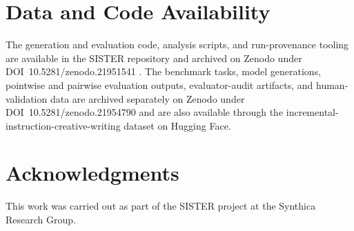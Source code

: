 \section*{Data and Code Availability}

The generation and evaluation code, analysis scripts, and run-provenance tooling are available in the SISTER repository \citep{repo_github} and archived on Zenodo under DOI~10.5281/zenodo.21951541 \citep{singh2026sister}. The benchmark tasks, model generations, pointwise and pairwise evaluation outputs, evaluator-audit artifacts, and human-validation data are archived separately on Zenodo under DOI~10.5281/zenodo.21954790 \citep{singh2026incrementaldata} and are also available through the incremental-instruction-creative-writing dataset on Hugging Face.

\section*{Acknowledgments}

This work was carried out as part of the SISTER project at the Synthica Research Group.
